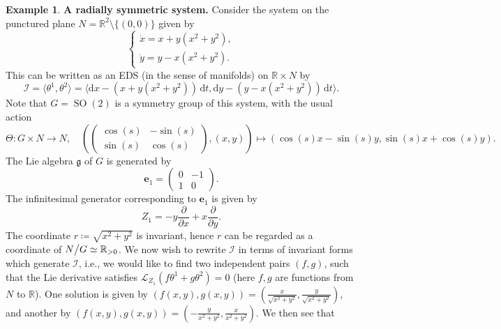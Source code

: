 \documentclass[11pt]{article}
\theoremstyle{plain}
\theoremstyle{definition}
\newtheorem{example}{Example}
\DeclareMathOperator\SO{SO}
\begin{document}
\begin{example} {\bf A radially symmetric system.}   Consider the system on the punctured plane $N=\mathbb{R}^2\setminus \{(0,0)\}$ given by
\begin{equation}\label{eqn:systemcartesian}
    \begin{cases} \dot{x}=x+y(x^2+y^2), \\ \dot{y}=y-x(x^2+y^2). \end{cases}
\end{equation}
This can be written as an EDS (in the sense of manifolds) on $\mathbb{R}\times N$ by
\begin{equation*}
    \mathcal{I}=\langle \theta^1,\theta^2\rangle=\langle \mathrm{d}x-(x+y(x^2+y^2))\, \mathrm{d}t,\mathrm{d}y-(y-x(x^2+y^2))\, \mathrm{d}t\rangle.
\end{equation*}
Note that $G=\SO(2)$ is a symmetry group of this system, with the usual action
\begin{equation*}
    \Theta\colon G\times N\longrightarrow N,\quad \left(\begin{pmatrix} \cos(s) & -\sin(s) \\ \sin(s) & \cos(s) \end{pmatrix},(x,y)\right)\longmapsto (\cos(s)x-\sin(s)y,\sin(s)x+\cos(s)y).
\end{equation*}
The Lie algebra $\mathfrak{g}$ of $G$ is generated by
\begin{equation*}
    \mathbf{e}_1=\begin{pmatrix} 0 & -1 \\ 1 & 0 \end{pmatrix}.
\end{equation*}
The infinitesimal generator corresponding to $\mathbf{e}_1$ is given by
\begin{equation*}
    Z_1=-y\frac{\partial}{\partial x}+x\frac{\partial}{\partial y}.
\end{equation*}
The coordinate $r\coloneqq \sqrt{x^2+y^2}$ is invariant, hence $r$ can be regarded as a coordinate of $N\big\slash G\simeq \mathbb{R}_{>0}$. We now wish to rewrite $\mathcal{I}$ in terms of invariant forms which generate $\mathcal{I}$, i.e., we would like to find two independent pairs $(f,g)$, such that the Lie derivative satisfies $\mathcal{L}_{Z_1}(f\theta^1+g\theta^2)=0$ (here $f,g$ are functions from $N$ to $\mathbb{R}$). One solution is given by $(f(x,y),g(x,y))=\left(\frac{x}{\sqrt{x^2+y^2}},\frac{y}{\sqrt{x^2+y^2}}\right)$, and another by $(f(x,y),g(x,y))=\left(-\frac{y}{x^2+y^2},\frac{x}{x^2+y^2}\right)$. We then see that

\end{example}
\end{document}
